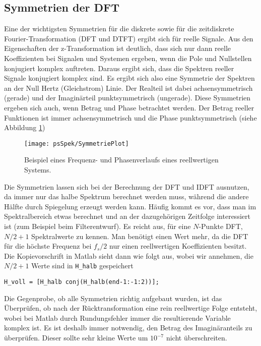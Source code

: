 

\subsection{Symmetrien der DFT}
Eine der wichtigsten Symmetrien für die diskrete sowie für die
zeitdiskrete Fourier-Transformation (DFT und DTFT) ergibt sich für
reelle Signale. Aus den Eigenschaften der z-Transformation ist
deutlich, dass sich nur dann reelle Koeffizienten bei Signalen und
Systemen ergeben, wenn die Pole und Nullstellen konjugiert komplex
auftreten. Daraus ergibt sich, dass die Spektren reeller Signale
konjugiert komplex sind. Es ergibt sich also eine Symmetrie der
Spektren an der Null Hertz (Gleichstrom) Linie. Der Realteil ist
dabei achsensymmetrisch (gerade) und der Imaginärteil punktsymmetrisch (ungerade).
Diese Symmetrien ergeben sich auch, wenn Betrag und Phase
betrachtet werden. Der Betrag reeller Funktionen ist immer
achsensymmetrisch und die Phase punktsymmetrisch (siehe Abbildung \ref{pic:SymmetrienDFT})
\begin{figure}[H]
\begin{center}
\texttt{[image: psSpek/SymmetriePlot]}
\caption{\label{pic:SymmetrienDFT}Beispiel eines Frequenz- und Phasenverlaufs eines reellwertigen Systems.}
\end{center}
\end{figure}

Die Symmetrien lassen sich bei der Berechnung der DFT und IDFT
ausnutzen, da immer nur das halbe Spektrum berechnet werden muss,
während die andere Hälfte durch Spiegelung erzeugt werden kann.
Häufig kommt es vor, dass man im Spektralbereich etwas berechnet
und an der dazugehörigen Zeitfolge interessiert ist (zum Beispiel
beim Filterentwurf). Es reicht aus, für eine $N$-Punkte DFT,
$N/2+1$ Spektralwerte zu kennen. Man benötigt einen Wert mehr, da
die DFT für die höchste Frequenz bei $f_s/2$ nur einen
reellwertigen Koeffizienten besitzt. Die Kopievorschrift in Matlab
sieht dann wie folgt aus, wobei wir annehmen, die $N/2+1$ Werte
sind in \verb/H_halb/ gespeichert
\begin{verbatim}
H_voll = [H_halb conj(H_halb(end-1:-1:2))];
\end{verbatim}
Die Gegenprobe, ob alle Symmetrien richtig aufgebaut wurden, ist
das Überprüfen, ob nach der Rücktransformation eine rein
reellwertige Folge entsteht, wobei bei Matlab durch Rundungsfehler
immer die resultierende Variable komplex ist. Es ist deshalb immer
notwendig, den Betrag des Imaginäranteils zu überprüfen. Dieser
sollte sehr kleine Werte um $10^{-7}$ nicht überschreiten.

